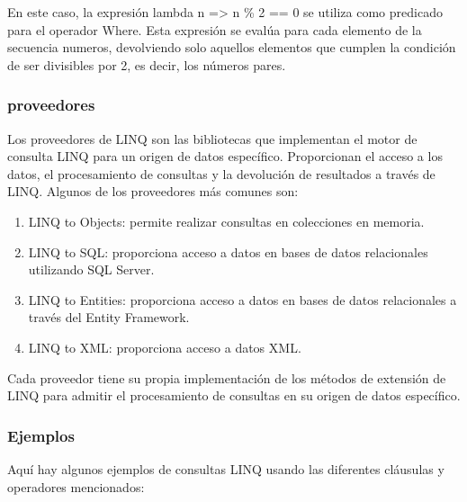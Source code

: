 \documentclass[executivepaper]{article}
\begin{document}
En este caso, la expresión lambda n => n \% 2 == 0 se utiliza como predicado para el operador Where. Esta expresión se evalúa para cada elemento de la secuencia numeros, devolviendo solo aquellos elementos que cumplen la condición de ser divisibles por 2, es decir, los números pares.

\subsubsection*{proveedores}

Los proveedores de LINQ son las bibliotecas que implementan el motor de consulta LINQ para un origen de datos específico. Proporcionan el acceso a los datos, el procesamiento de consultas y la devolución de resultados a través de LINQ. Algunos de los proveedores más comunes son:
\begin{enumerate}
    \item LINQ to Objects: permite realizar consultas en colecciones en memoria.
    \item LINQ to SQL: proporciona acceso a datos en bases de datos relacionales utilizando SQL Server.
    \item LINQ to Entities: proporciona acceso a datos en bases de datos relacionales a través del Entity Framework.
    \item LINQ to XML: proporciona acceso a datos XML.
\end{enumerate}
Cada proveedor tiene su propia implementación de los métodos de extensión de LINQ para admitir el procesamiento de consultas en su origen de datos específico.

\subsubsection*{Ejemplos}

Aquí hay algunos ejemplos de consultas LINQ usando las diferentes cláusulas y operadores mencionados:
\end{document}
